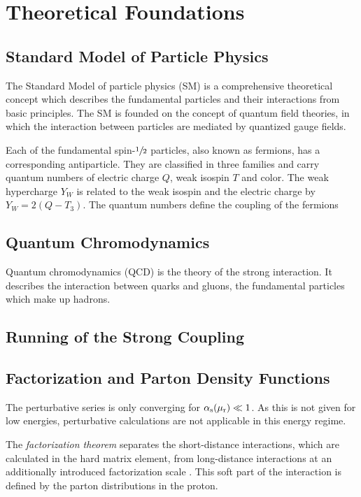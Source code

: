 
\chapter{Theoretical Foundations}

\section{Standard Model of Particle Physics}

The Standard Model of particle physics (SM) is a comprehensive theoretical
concept which describes the fundamental particles and their interactions from
basic principles. The SM is founded on the concept of quantum field theories, in
which the interaction between particles are mediated by quantized gauge fields.

Each of the fundamental spin-$\sfrac{1}{2}$ particles, also known as fermions,
has a corresponding antiparticle. They are classified in three families and
carry quantum numbers of electric charge $Q$, weak isospin $T$ and color. The
weak hypercharge $Y_W$ is related to the weak isospin and the electric charge by
$Y_W = 2(Q-T_3)$. The quantum numbers define the coupling of the fermions

\section{Quantum Chromodynamics}

Quantum chromodynamics (QCD) is the theory of the strong interaction. It
describes the interaction between quarks and gluons, the fundamental particles
which make up hadrons.


\section{Running of the Strong Coupling}


\section{Factorization and Parton Density Functions}

The perturbative series is only converging for $\alpha_\mathrm{s}(\mu_{\mathrm{r}}) \ll 1$. As this is not
given for low energies, perturbative calculations are not applicable in this
energy regime. 

The \emph{factorization theorem} separates the short-distance interactions,
which are calculated in the hard matrix element, from long-distance
interactions at an additionally introduced factorization scale \muf. This soft
part of the interaction is defined by the parton distributions in the proton.

